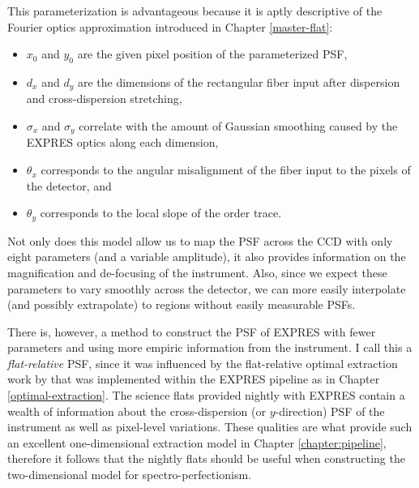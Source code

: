 This parameterization is advantageous because it is aptly descriptive of the Fourier optics approximation introduced in Chapter \ref{master-flat}:
\begin{itemize}
    \item $x_0$ and $y_0$ are the given pixel position of the parameterized PSF,
    \item $d_x$ and $d_y$ are the dimensions of the rectangular fiber input after dispersion and cross-dispersion stretching,
    \item $\sigma_x$ and $\sigma_y$ correlate with the amount of Gaussian smoothing caused by the EXPRES optics along each dimension,
    \item $\theta_x$ corresponds to the angular misalignment of the fiber input to the pixels of the detector, and
    \item $\theta_y$ corresponds to the local slope of the order trace.
\end{itemize}
Not only does this model allow us to map the PSF across the CCD with only eight parameters (and a variable amplitude), it also provides information on the magnification and de-focusing of the instrument. Also, since we expect these parameters to vary smoothly across the detector, we can more easily interpolate (and possibly extrapolate) to regions without easily measurable PSFs.

There is, however, a method to construct the PSF of EXPRES with fewer parameters and using more empiric information from the instrument. I call this a \textit{flat-relative} PSF, since it was influenced by the flat-relative optimal extraction work by \citet{zechmeister_flat-relative_2014} that was implemented within the EXPRES pipeline as in Chapter \ref{optimal-extraction}. The science flats provided nightly with EXPRES contain a wealth of information about the cross-dispersion (or $y$-direction) PSF of the instrument as well as pixel-level variations. These qualities are what provide such an excellent one-dimensional extraction model in Chapter \ref{chapter:pipeline}, therefore it follows that the nightly flats should be useful when constructing the two-dimensional model for spectro-perfectionism.

